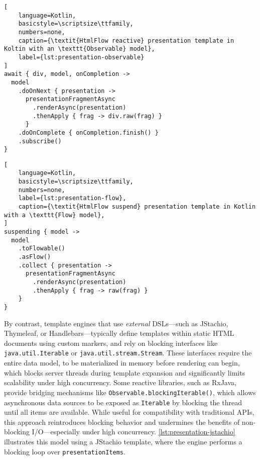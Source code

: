 \begin{center}
\begin{minipage}{0.50\textwidth}
\begin{lstlisting}[
    language=Kotlin,
    basicstyle=\scriptsize\ttfamily,
    numbers=none,
    caption={\textit{HtmlFlow reactive} presentation template in Koltin with an \texttt{Observable} model},
    label={lst:presentation-observable}
]
await { div, model, onCompletion ->
  model
    .doOnNext { presentation ->
      presentationFragmentAsync
        .renderAsync(presentation)
        .thenApply { frag -> div.raw(frag) }
      }
    .doOnComplete { onCompletion.finish() }
    .subscribe()
}
\end{lstlisting}
\end{minipage}
\hfill
\begin{minipage}{0.46\textwidth}
\begin{lstlisting}[
    language=Kotlin,
    basicstyle=\scriptsize\ttfamily,
    numbers=none,
    label={lst:presentation-flow},
    caption={\textit{HtmlFlow suspend} presentation template in Kotlin with a \texttt{Flow} model},
]
suspending { model ->
  model
    .toFlowable()
    .asFlow()
    .collect { presentation ->
      presentationFragmentAsync
        .renderAsync(presentation)
        .thenApply { frag -> raw(frag) }
    }
}
\end{lstlisting}
\end{minipage}
\end{center}

By contrast, template engines that use \textit{external} DSLs—such as JStachio,
Thymeleaf, or Handlebars—typically define templates within static HTML
documents using custom markers, and rely on blocking interfaces like
\texttt{java.util.Iterable} or \texttt{java.util.stream.Stream}.
These interfaces require the entire data
model, to be materialized in memory before rendering can begin, which blocks server
threads during template expansion and significantly limits scalability under
high concurrency.
Some reactive libraries, such as RxJava, provide bridging mechanisms like
\texttt{Observable.blockingIterable()}, which allows asynchronous data sources
to be exposed as \texttt{Iterable} by blocking the thread until all items are available.
While useful for compatibility with traditional APIs, this approach
reintroduces blocking behavior and undermines the benefits of non-blocking
I/O—especially under high concurrency. \autoref{lst:presentation-jstachio}
illustrates this model using a JStachio template, where the engine performs a
blocking loop over \texttt{presentationItems}.

